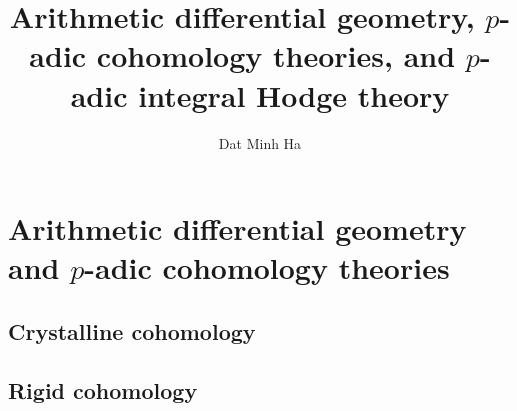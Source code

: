 

\setcounter{section}{-1}





	\title{Arithmetic differential geometry, \texorpdfstring{$p$}{}-adic cohomology theories, and \texorpdfstring{$p$}{}-adic integral Hodge theory}
	
	\author{Dat Minh Ha}
	\maketitle
	
	\begin{abstract}
	    
	\end{abstract}
	
	{
      \hypersetup{} 
      \tableofcontents %
    }
    
    \part{Arithmetic differential geometry and \texorpdfstring{$p$}{}-adic cohomology theories}
        \chapter{Crystalline cohomology}
            \begin{abstract}
                
            \end{abstract}
            
            \minitoc
            
            
            
            
            
        \chapter{Rigid cohomology}
            \begin{abstract}
                
            \end{abstract}
            
            \minitoc
            
            
            
